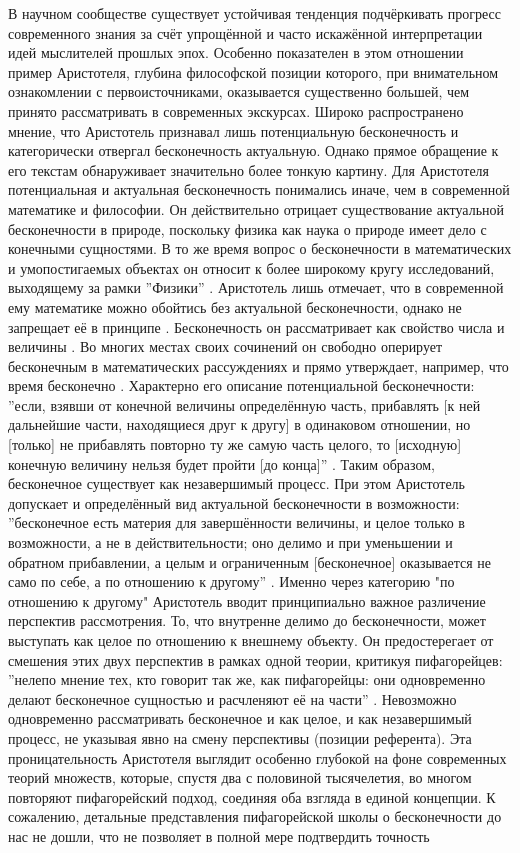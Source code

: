\documentclass[12pt]{article}
\begin{document}
В научном сообществе существует устойчивая тенденция подчёркивать прогресс современного знания за счёт упрощённой и часто искажённой интерпретации идей мыслителей прошлых эпох. Особенно показателен в этом отношении пример Аристотеля, глубина философской позиции которого, при внимательном ознакомлении с первоисточниками, оказывается существенно большей, чем принято рассматривать в современных экскурсах. Широко распространено мнение, что Аристотель признавал лишь потенциальную бесконечность и категорически отвергал бесконечность актуальную. Однако прямое обращение к его текстам обнаруживает значительно более тонкую картину. Для Аристотеля потенциальная и актуальная бесконечность понимались иначе, чем в современной математике и философии. Он действительно отрицает существование актуальной бесконечности в природе, поскольку физика как наука о природе имеет дело с конечными сущностями. В то же время вопрос о бесконечности в математических и умопостигаемых объектах он относит к более широкому кругу исследований, выходящему за рамки ''Физики'' \cite{aristotle-infinity-scope}. Аристотель лишь отмечает, что в современной ему математике можно обойтись без актуальной бесконечности, однако не запрещает её в принципе \cite{aristotle-actual-infinity}. Бесконечность он рассматривает как свойство числа и величины \cite{aristotle-infinity-property}. Во многих местах своих сочинений он свободно оперирует бесконечным в математических рассуждениях и прямо утверждает, например, что время бесконечно \cite{aristotle-infinite-time}. Характерно его описание потенциальной бесконечности: ''если, взявши от конечной величины определённую часть, прибавлять [к ней дальнейшие части, находящиеся друг к другу] в одинаковом отношении, но [только] не прибавлять повторно ту же самую часть целого, то [исходную] конечную величину нельзя будет пройти [до конца]'' \cite{aristotle-modern-potential}. Таким образом, бесконечное существует как незавершимый процесс. При этом Аристотель допускает и определённый вид актуальной бесконечности в возможности: ''бесконечное есть материя для завершённости величины, и целое только в возможности, а не в действительности; оно делимо и при уменьшении и обратном прибавлении, а целым и ограниченным [бесконечное] оказывается не само по себе, а по отношению к другому'' \cite{aristotle-modern-actual}. Именно через категорию "по отношению к другому" Аристотель вводит принципиально важное различение перспектив рассмотрения. То, что внутренне делимо до бесконечности, может выступать как целое по отношению к внешнему объекту. Он предостерегает от смешения этих двух перспектив в рамках одной теории, критикуя пифагорейцев: ''нелепо мнение тех, кто говорит так же, как пифагорейцы: они одновременно делают бесконечное сущностью и расчленяют её на части'' \cite{aristotle-pythagoras}. Невозможно одновременно рассматривать бесконечное и как целое, и как незавершимый процесс, не указывая явно на смену перспективы (позиции референта). Эта проницательность Аристотеля выглядит особенно глубокой на фоне современных теорий множеств, которые, спустя два с половиной тысячелетия, во многом повторяют пифагорейский подход, соединяя оба взгляда в единой концепции. К сожалению, детальные представления пифагорейской школы о бесконечности до нас не дошли, что не позволяет в полной мере подтвердить точность 
\end{document}
